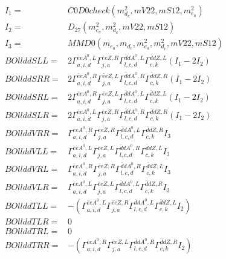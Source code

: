 \documentclass[A4,landscape]{article}
\begin{document}
\begin{align} 
I_1 = & C0D0check(m^2_{d_{{c}}}, mV22, mS12, m^2_{e_{{a}}}) \\ 
I_2 = & D_{27}(m^2_{e_{{a}}}, m^2_{d_{{c}}}, mV22, mS12) \\ 
I_3 = & MMD0(m_{e_{{a}}}, m_{d_{{c}}}, m^2_{e_{{a}}}, m^2_{d_{{c}}}, mV22, mS12) \\ 
  BOllddSLL= & 2  \Gamma^{\bar{e}e A^0 ,L}_{a, i, d} \Gamma^{\bar{e}e Z ,R}_{j, a} \Gamma^{\bar{d}d A^0 ,L}_{l, c, d} \Gamma^{\bar{d}d Z ,L}_{c, k} (I_1 - 2 I_2) \\ 
  BOllddSRR= & 2  \Gamma^{\bar{e}e A^0 ,R}_{a, i, d} \Gamma^{\bar{e}e Z ,L}_{j, a} \Gamma^{\bar{d}d A^0 ,R}_{l, c, d} \Gamma^{\bar{d}d Z ,R}_{c, k} (I_1 - 2 I_2) \\ 
  BOllddSRL= & 2  \Gamma^{\bar{e}e A^0 ,R}_{a, i, d} \Gamma^{\bar{e}e Z ,L}_{j, a} \Gamma^{\bar{d}d A^0 ,L}_{l, c, d} \Gamma^{\bar{d}d Z ,L}_{c, k} (I_1 - 2 I_2) \\ 
  BOllddSLR= & 2  \Gamma^{\bar{e}e A^0 ,L}_{a, i, d} \Gamma^{\bar{e}e Z ,R}_{j, a} \Gamma^{\bar{d}d A^0 ,R}_{l, c, d} \Gamma^{\bar{d}d Z ,R}_{c, k} (I_1 - 2 I_2) \\ 
  BOllddVRR= &  \Gamma^{\bar{e}e A^0 ,R}_{a, i, d} \Gamma^{\bar{e}e Z ,R}_{j, a} \Gamma^{\bar{d}d A^0 ,L}_{l, c, d} \Gamma^{\bar{d}d Z ,R}_{c, k} I_3 \\ 
  BOllddVLL= &  \Gamma^{\bar{e}e A^0 ,L}_{a, i, d} \Gamma^{\bar{e}e Z ,L}_{j, a} \Gamma^{\bar{d}d A^0 ,R}_{l, c, d} \Gamma^{\bar{d}d Z ,L}_{c, k} I_3 \\ 
  BOllddVRL= &  \Gamma^{\bar{e}e A^0 ,R}_{a, i, d} \Gamma^{\bar{e}e Z ,R}_{j, a} \Gamma^{\bar{d}d A^0 ,R}_{l, c, d} \Gamma^{\bar{d}d Z ,L}_{c, k} I_3 \\ 
  BOllddVLR= &  \Gamma^{\bar{e}e A^0 ,L}_{a, i, d} \Gamma^{\bar{e}e Z ,L}_{j, a} \Gamma^{\bar{d}d A^0 ,L}_{l, c, d} \Gamma^{\bar{d}d Z ,R}_{c, k} I_3 \\ 
  BOllddTLL= & -( \Gamma^{\bar{e}e A^0 ,L}_{a, i, d} \Gamma^{\bar{e}e Z ,R}_{j, a} \Gamma^{\bar{d}d A^0 ,L}_{l, c, d} \Gamma^{\bar{d}d Z ,L}_{c, k} I_2) \\ 
  BOllddTLR= & 0 \\ 
  BOllddTRL= & 0 \\ 
  BOllddTRR= & -( \Gamma^{\bar{e}e A^0 ,R}_{a, i, d} \Gamma^{\bar{e}e Z ,L}_{j, a} \Gamma^{\bar{d}d A^0 ,R}_{l, c, d} \Gamma^{\bar{d}d Z ,R}_{c, k} I_2) \\ 
\end{align} 
\end{document}
